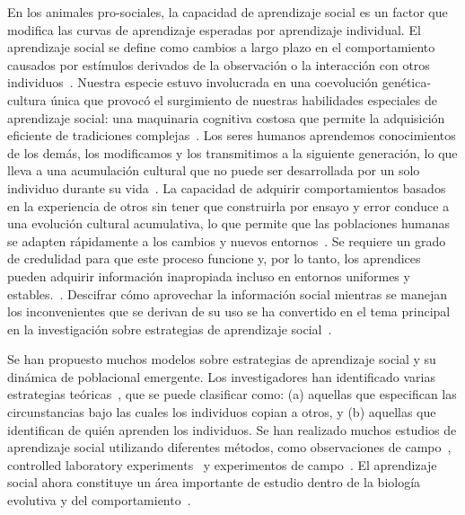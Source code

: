 \documentclass[a4paper,11pt]{book}
\theoremstyle{definition}
\begin{document}
En los animales pro-sociales, la capacidad de aprendizaje social es un factor que modifica las curvas de aprendizaje esperadas por aprendizaje individual.
%
El aprendizaje social se define como cambios a largo plazo en el comportamiento causados por est\'imulos derivados de la observaci\'on o la interacci\'on con otros individuos~\cite{hoppitt2013-socialLearningAnIntroductionBook,bandura1977-socialLearning}.
%
Nuestra especie estuvo involucrada en una coevoluci\'on gen\'etica-cultura \'unica que provoc\'o el surgimiento de nuestras habilidades especiales de aprendizaje social: una maquinaria cognitiva costosa que permite la adquisici\'on eficiente de tradiciones complejas~\cite{Richerson2010}.
%
Los seres humanos aprendemos conocimientos de los dem\'as, los modificamos y los transmitimos a la siguiente generaci\'on, lo que lleva a una acumulaci\'on cultural que no puede ser desarrollada por un solo individuo durante su vida~\cite{boyd1985-evolutionaryProcess}.
%
La capacidad de adquirir comportamientos basados en la experiencia de otros sin tener que construirla por ensayo y error conduce a una evoluci\'on cultural acumulativa, lo que permite que las poblaciones humanas se adapten r\'apidamente a los cambios y nuevos entornos~\cite{Boyd2011}.
%
Se requiere un grado de credulidad para que este proceso funcione y, por lo tanto, los aprendices pueden adquirir informaci\'on inapropiada incluso en entornos uniformes y estables.~\cite{feldman1996-individualVsSocialLearningEvolutionaryAnalysis,giraldeau2002-potentialDisadvantagesSocialLearning}.
%
Descifrar c\'omo aprovechar la informaci\'on social mientras se manejan los inconvenientes que se derivan de su uso se ha convertido en el tema principal en la investigaci\'on sobre estrategias de aprendizaje social~\cite{henrich2003-evolutionOfCulturalEvolution,rendell2011-cognitiveCulture}.


Se han propuesto muchos modelos sobre estrategias de aprendizaje social y su din\'amica de poblacional emergente.
%
Los investigadores han identificado varias estrategias te\'oricas~\cite{rendell2011-cognitiveCulture,rendell2010-socialLearningTournament}, que se puede clasificar como:
(a) aquellas que especifican las circunstancias bajo las cuales los individuos copian a otros, y
(b) aquellas que identifican de qui\'en aprenden los individuos.
%
Se han realizado muchos estudios de aprendizaje social utilizando diferentes m\'etodos, como observaciones de campo~\cite{henrich2011-adaptativeLearningBiasesFiji}, controlled laboratory experiments~\cite{mesoudi2011-experimentalPayoffBiasedSocialLearningUnderused,toelch2014-humanSocialInformationUse,caldwell2016-innovationLaboratoryCulturalEvolution,muthukrishna2016-whenAndWhoSocialLearning} y experimentos de campo~\cite{henrich2001-eco15Soc,efferson2007-learningCulturalTransmissionBolivia,wisdom2013-experiment,Glowacki2017}.
%
El aprendizaje social ahora constituye un \'area importante de estudio dentro de la biolog\'ia evolutiva y del comportamiento~\cite{mesoudi2016-individualAndCulturalVariationSocialLearning}.
\end{document}
